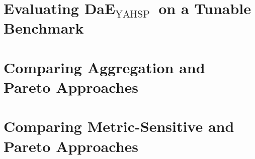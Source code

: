 \documentclass[english]{DESCARWINreport}
\newcounter{con}
\newcommand{\DAEYAHSP}{{\sc DaE$_{\text{YAHSP}}$}}
\begin{document}
\begin{abstract}
\begin{itemize}
This work has been published as: ``Mostepha Redouane Khouadjia, Marc Schoenauer, Vincent Vidal, Johann Dréo and Pierre Savéant, {\em Multi-Objective AI Planning: Comparing Aggregation and Pareto Approaches}. In Martin Middendorf and Christian Blum, Eds, Proc. 13th European Conference on Evolutionary Computation in Combinatorial Optimisation (EvoCOP2013), pp 202-213, LNCS 7832, Springer Verlag, 2013.''

\item The last series of experiments validates the multi-objective \DAEYAHSP\ approach against the only competitor from the AI Planning community, i.e. the approach using the metric-sensitive planner LPG, one of the state-of-the-art planner in single-objective setting, that can however directly handle aggregated objectives. The comparative experiments here involve not only the {\tt Zeno} test-bench, but also the other domains and instances proposed in Deliverable 3.1 based on the multi-objectivizations of some IPC7 (single-objective) domains. In most cases, \DAEYAHSP\ is found to outperform the LPG-based approach.

This work has been accepted at IJCAI 2013 conference, August 2013, as ``Mostepha Redouane Khouadjia, Marc Schoenauer, Vincent Vidal, Johann Dréo and Pierre Savéant, {\em Pareto-Based Multiobjective AI Planning}. In Proc. 23rd International Joint Conference on Artificial Intelligence (IJCAI 2013), 2013.''
\end{itemize}



\end{abstract}


\tableofcontents

\newpage

\chapter{Evaluating \DAEYAHSP\ on a Tunable Benchmark}



\newpage
\hoffset 0cm

\newpage
\hoffset -2cm

\chapter{Comparing Aggregation and Pareto Approaches}

\newpage
\hoffset 0cm

\newpage
\hoffset -2cm

\chapter{Comparing Metric-Sensitive and Pareto Approaches}

\newpage
\hoffset 0cm

\hoffset -2cm
\end{document}
